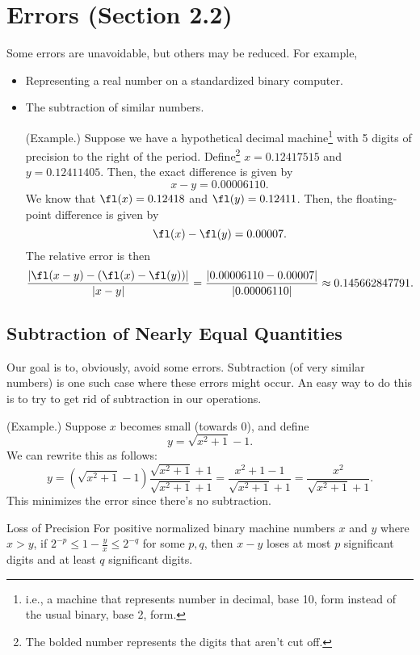 \documentclass[letterpaper]{article}
\begin{document}
\section{Errors (Section 2.2)}
Some errors are unavoidable, but others may be reduced. For example, 
\begin{itemize}
    \item Representing a real number on a standardized binary computer. 
    \item The subtraction of similar numbers. 
    \begin{mdframed}
        (Example.) Suppose we have a hypothetical decimal machine\footnote{i.e., a machine that represents number in decimal, base 10, form instead of the usual binary, base 2, form.} with 5 digits of precision to the right of the period. Define\footnote{The bolded number represents the digits that aren't cut off.} $x = \mathbf{0.12417}515$ and $y = \mathbf{0.12411}405.$ Then, the exact difference is given by 
        \[x - y = \mathbf{0.00006}110.\]
        We know that $\fl(x) = 0.12418$ and $\fl(y) = 0.12411$. Then, the floating-point difference is given by 
        \[\fl(x) - \fl(y) = 0.00007.\]
        The relative error is then 
        \[\frac{|\fl(x - y) - (\fl(x) - \fl(y))|}{|x - y|} = \frac{|0.00006110 - 0.00007|}{|0.00006110|} \approx 0.145662847791.\]
    \end{mdframed}
\end{itemize}

\subsection{Subtraction of Nearly Equal Quantities}
Our goal is to, obviously, avoid some errors. Subtraction (of very similar numbers) is one such case where these errors might occur. An easy way to do this is to try to get rid of subtraction in our operations. 
\begin{mdframed}
    (Example.) Suppose $x$ becomes small (towards 0), and define \[y = \sqrt{x^2 + 1} - 1.\] We can rewrite this as follows: 
    \[y = (\sqrt{x^2 + 1} - 1)\frac{\sqrt{x^2 + 1} + 1}{\sqrt{x^2 + 1} + 1} = \frac{x^2 + 1 - 1}{\sqrt{x^2 + 1} + 1} = \frac{x^2}{\sqrt{x^2 + 1} + 1}.\]
    This minimizes the error since there's no subtraction.
\end{mdframed}

\begin{theorem}{Loss of Precision}{}
    For positive normalized binary machine numbers $x$ and $y$ where $x > y$, if $2^{-p} \leq 1 - \frac{y}{x} \leq 2^{-q}$ for some $p, q$, then $x - y$ loses at most $p$ significant digits and at least $q$ significant digits.
\end{theorem}
\end{document}

